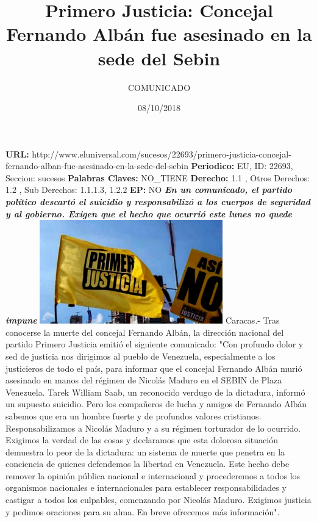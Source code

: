 \documentclass{article}%
\title{\textbf{Primero Justicia: Concejal Fernando Albán fue asesinado en la sede del Sebin}}%
\author{COMUNICADO}%
\date{08/10/2018}%
\begin{document}
%
\normalsize%
\maketitle%
\textbf{URL: }%
http://www.eluniversal.com/sucesos/22693/primero{-}justicia{-}concejal{-}fernando{-}alban{-}fue{-}asesinado{-}en{-}la{-}sede{-}del{-}sebin\newline%
%
\textbf{Periodico: }%
EU, %
ID: %
22693, %
Seccion: %
sucesos\newline%
%
\textbf{Palabras Claves: }%
NO\_TIENE\newline%
%
\textbf{Derecho: }%
1.1%
, Otros Derechos: %
1.2%
, Sub Derechos: %
1.1.1.3, 1.2.2%
\newline%
%
\textbf{EP: }%
NO\newline%
\newline%
%
\textbf{\textit{En un comunicado, el partido político descartó  el suicidio y responsabilizó a los cuerpos de seguridad y al gobierno. Exigen que el hecho que ocurrió este lunes no quede impune}}%
\newline%
\newline%
%
\includegraphics[width=300px]{149.jpg}%
\newline%
%
Caracas.{-} Tras conocerse la muerte del concejal Fernando Albán, la dirección nacional del partido Primero Justicia emitió el siguiente comunicado:%
\newline%
%
"Con profundo dolor y sed de justicia nos dirigimos al pueblo de Venezuela, especialmente a los justicieros de todo el país, para informar que el concejal Fernando Albán murió asesinado en manos del régimen de Nicolás Maduro en el SEBIN de Plaza Venezuela. Tarek William Saab, un reconocido verdugo de la dictadura, informó un supuesto suicidio. Pero los compañeros de lucha y amigos de Fernando Albán sabemos que era un hombre fuerte y de profundos valores cristianos. Responsabilizamos a Nicolás Maduro y a su régimen torturador de lo ocurrido. Exigimos la verdad de las cosas y declaramos que esta dolorosa situación demuestra lo peor de la dictadura: un sistema de muerte que penetra en la conciencia de quienes defendemos la libertad en Venezuela. Este hecho debe remover la opinión pública nacional e internacional y procederemos a todos los organismos nacionales e internacionales para establecer responsabilidades y castigar a todos los culpables, comenzando por Nicolás Maduro.\newline%
\newline%
Exigimos justicia y pedimos oraciones para su alma. En breve ofrecemos más información".%
\newline%
%
\end{document}
